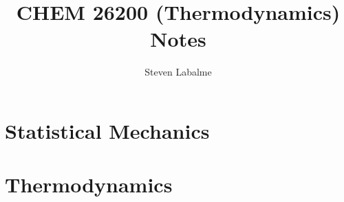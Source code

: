 \documentclass{report}
\title{CHEM 26200 (Thermodynamics) Notes}
\author{Steven Labalme}
\renewcommand{\chaptername}{Week}
\begin{document}
\maketitle



\tableofcontents
\listoffigures
\newpage



\pagestyle{main}
\renewcommand{\chaptermark}[1]{\markboth{\chaptername\ \thechapter\ (#1)}{}}
\part{Statistical Mechanics}




\part{Thermodynamics}




\printbibliography[heading=bibintoc]
\end{document}
